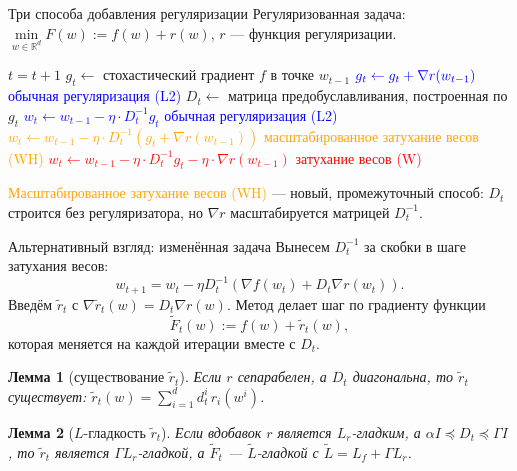 \documentclass[aspectratio=169, 12pt]{beamer}
\newtheorem*{lemma_rus}{Лемма}
\begin{document}
\begin{frame}[shrink=5]{Три способа добавления регуляризации}
Регуляризованная задача: $\min\limits_{w \in \mathbb{R}^d} F(w) := f(w) + r(w)$, \quad $r$ --- функция регуляризации.
\vspace{-0.15cm}
\begin{algorithm}[H]
    \caption{Способы использования предобуславливания с регуляризацией}
    \label{alg:precond}
    \begin{algorithmic}
            \footnotesize
            \State $t = t+1$
            \State $g_t \gets$ стохастический градиент $f$ в точке $w_{t-1}$
            \State $\textcolor{blue}{g_t \gets g_t + \nabla r(w_{t-1})}$ \hfill \textcolor{blue}{обычная регуляризация (L2)}
            \State $D_t \gets$ матрица предобуславливания, построенная по $g_t$
            \State \textcolor{blue}{$w_t \gets w_{t-1} - \eta \cdot D_t^{-1}g_t $} \hfill \textcolor{blue}{обычная регуляризация (L2)}
            \State \textcolor{orange}{$w_t \gets w_{t-1} - \eta \cdot D_t^{-1} \left(g_t +\nabla r(w_{t-1}) \right)$} \hfill \textcolor{orange}{масштабированное затухание весов (WH)}
            \State \textcolor{red}{$w_t \gets w_{t-1} - \eta \cdot D_t^{-1} g_t  - \eta \cdot \nabla r(w_{t-1})$} \hfill \textcolor{red}{затухание весов (W)}
            \EndWhile
    \end{algorithmic}
\end{algorithm}
\vspace{-0.1cm}
\footnotesize{\textcolor{orange}{Масштабированное затухание весов (WH)} --- новый, промежуточный способ: $D_t$ строится без регуляризатора, но $\nabla r$ масштабируется матрицей $D_t^{-1}$.}
\end{frame}

\begin{frame}{Альтернативный взгляд: изменённая задача}
Вынесем $D_t^{-1}$ за скобки в шаге затухания весов:
\begin{equation*}
    w_{t+1} = w_t - \eta D_t^{-1}(\nabla f(w_t) + D_t \nabla r(w_t)).
\end{equation*}
Введём $\widetilde{r}_t$ с $\nabla \widetilde{r}_t(w) = D_t \nabla r(w)$. Метод делает шаг по градиенту функции
\begin{equation*}
\label{F_tilde}
    \widetilde{F}_t(w) := f(w) + \widetilde{r}_t(w),
\end{equation*}
которая меняется на каждой итерации вместе с $D_t$.
\begin{lemma_rus}[существование $\widetilde{r}_t$]
    Если $r$ сепарабелен, а $D_t$ диагональна, то $\widetilde{r}_t$ существует:
    $\widetilde{r}_t(w) = \sum_{i=1}^d d_t^i \, r_i(w^i)$.
\end{lemma_rus}
\begin{lemma_rus}[$L$-гладкость $\widetilde{r}_t$]
    Если вдобавок $r$ является $L_r$-гладким, а $\alpha I \preccurlyeq D_t \preccurlyeq \Gamma I$, то $\widetilde{r}_t$ является $\Gamma L_r$-гладкой, а $\widetilde{F}_t$ --- $\widetilde{L}$-гладкой с $\widetilde{L} = L_f + \Gamma L_r$.
\end{lemma_rus}
\end{frame}
\end{document}
